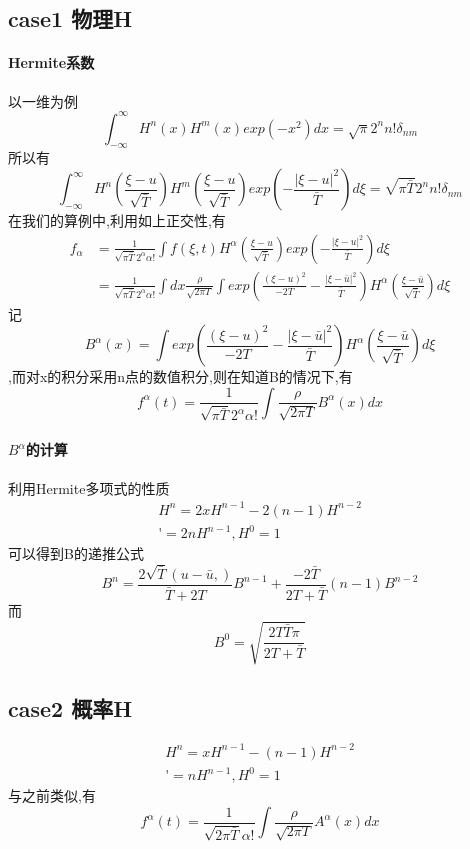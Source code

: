 \documentclass[UTF8]{ctexart}
\begin{document}
    \subsection{case1 物理H}
    \paragraph{Hermite系数}
     以一维为例
     $$
     \int_{-\infty}^{\infty}H^n(x)H^m(x)exp(-x^2)dx=\sqrt{\pi}2^nn!\delta_{nm}
    $$
    所以有$$
    \int_{-\infty}^{\infty}H^n(\frac{\xi-u}{\sqrt{\bar{T}}})H^m(\frac{\xi-u}{\sqrt{\bar{T}}})exp(-\frac{|\xi-u|^2}{\bar{T}})d\xi = \sqrt{\pi\bar{T}}2^nn!\delta_{nm}
    $$
    在我们的算例中,利用如上正交性,有
    \begin{equation*}
      \begin{split}
         f_{\alpha} & =\frac{1}{\sqrt{\pi\bar{T}}2^{\alpha}\alpha!}\int f(\xi,t)H^{\alpha}(\frac{\xi-u}{\sqrt{\bar{T}}})exp(-\frac{|\xi-u|^2}{\bar{T}})d\xi \\
           & =\frac{1}{\sqrt{\pi\bar{T}}2^{\alpha}\alpha!}\int dx \frac{\rho}{\sqrt{2\pi T}}\int exp(\frac{(\xi-u)^2}{-2T}-\frac{|\xi-\bar{u}|^2}{\bar{T}})H^{\alpha}(\frac{\xi-\bar{u}}{\sqrt{\bar{T}}})d\xi
      \end{split}
    \end{equation*}
    记$$B^{\alpha}(x)=\int  exp(\frac{(\xi-u)^2}{-2T}-\frac{|\xi-\bar{u}|^2}{\bar{T}})H^{\alpha}(\frac{\xi-\bar{u}}{\sqrt{\bar{T}}})d\xi$$,而对x的积分采用n点的数值积分,则在知道B的情况下,有
    $$
    f^{\alpha}(t)=\frac{1}{\sqrt{\pi\bar{T}}2^{\alpha}\alpha!}\int  \frac{\rho}{\sqrt{2\pi T}} B^{\alpha}(x) dx
    $$

    \paragraph{$B^{\alpha}$的计算}
    利用Hermite多项式的性质
    \begin{equation*}
      \begin{matrix}
         H^n = 2xH^{n-1}-2(n-1)H^{n-2} \\
         \mathop{(H^{n})'}=2nH^{n-1},H^0 = 1
      \end{matrix}
    \end{equation*}
    可以得到B的递推公式
    $$
    B^n = \frac{2\sqrt{\bar{T}}(u-\bar{u},)}{\bar{T}+2T}B^{n-1}+\frac{-2\bar{T}}{2T+\bar{T}}(n-1)B^{n-2}
    $$
    而
    $$
    B^0 = \sqrt{\frac{2T\bar{T}\pi}{2T+\bar{T}}}
    $$
    
    \subsection{case2 概率H}
        \begin{equation*}
      \begin{matrix}
         H^n = xH^{n-1}-(n-1)H^{n-2} \\
         \mathop{(H^{n})'}=nH^{n-1},H^0 = 1
      \end{matrix}
    \end{equation*}
    与之前类似,有
   $$
    f^{\alpha}(t)=\frac{1}{\sqrt{2\pi\bar{T}}\alpha!}\int  \frac{\rho}{\sqrt{2\pi T}} A^{\alpha}(x) dx
    $$
\end{document}

